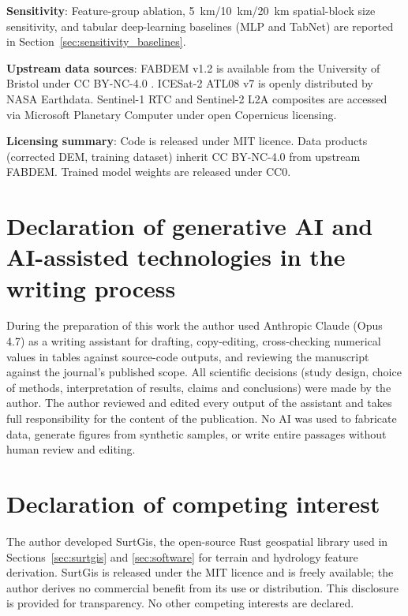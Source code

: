 \documentclass[preprint,authoryear,number]{elsarticle}
\begin{document}
\textbf{Sensitivity}: Feature-group ablation, \SI{5}{\kilo\meter}/\SI{10}{\kilo\meter}/\SI{20}{\kilo\meter} spatial-block size sensitivity, and tabular deep-learning baselines (MLP and TabNet) are reported in Section~\ref{sec:sensitivity_baselines}.

\textbf{Upstream data sources}: FABDEM v1.2 is available from the University of Bristol under CC BY-NC-4.0 \citep{Hawker2022FABDEM}. ICESat-2 ATL08 v7 is openly distributed by NASA Earthdata. Sentinel-1 RTC and Sentinel-2 L2A composites are accessed via Microsoft Planetary Computer under open Copernicus licensing.

\textbf{Licensing summary}: Code is released under MIT licence. Data products (corrected DEM, training dataset) inherit CC BY-NC-4.0 from upstream FABDEM. Trained model weights are released under CC0.


\section*{Declaration of generative AI and AI-assisted technologies in the writing process}

During the preparation of this work the author used Anthropic Claude (Opus 4.7) as a writing assistant for drafting, copy-editing, cross-checking numerical values in tables against source-code outputs, and reviewing the manuscript against the journal's published scope. All scientific decisions (study design, choice of methods, interpretation of results, claims and conclusions) were made by the author. The author reviewed and edited every output of the assistant and takes full responsibility for the content of the publication. No AI was used to fabricate data, generate figures from synthetic samples, or write entire passages without human review and editing.

\section*{Declaration of competing interest}

The author developed SurtGis, the open-source Rust geospatial library used in Sections~\ref{sec:surtgis} and \ref{sec:software} for terrain and hydrology feature derivation. SurtGis is released under the MIT licence and is freely available; the author derives no commercial benefit from its use or distribution. This disclosure is provided for transparency. No other competing interests are declared.
\end{document}
